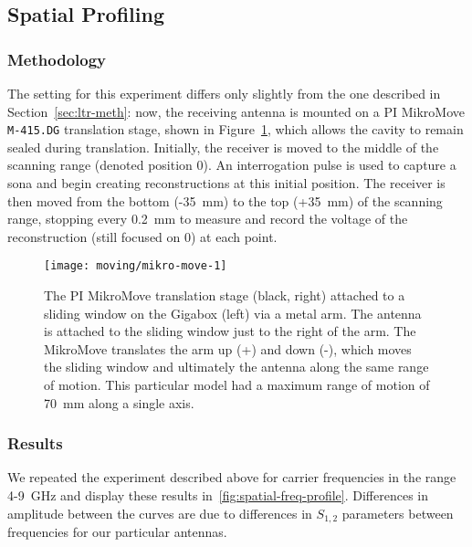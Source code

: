 \subsection{Spatial Profiling}
\label{sec:spatial-profile}
\subsubsection{Methodology}

The setting for this experiment differs only slightly from the one described in Section~\ref{sec:ltr-meth}: now, the receiving antenna is mounted on a PI MikroMove \texttt{M-415.DG} translation stage, shown in Figure~\ref{fig:mikro-move}, which allows the cavity to remain sealed during translation.  Initially, the receiver is moved to the middle of the scanning range (denoted position 0). An interrogation pulse is used to capture a sona and begin creating reconstructions at this initial position. The receiver is then moved from the bottom (-35~mm) to the top (+35~mm) of the scanning range, stopping every 0.2~mm to measure and record the \ptp{} voltage of the reconstruction (still focused on 0) at each point.

\begin{figure}[h!]
\centering
\texttt{[image: moving/mikro-move-1]}
    \caption[MikroMove Translation Stage]{The PI MikroMove translation stage (black, right) attached to a sliding window on the Gigabox (left) via a metal arm. The antenna is attached to the sliding window just to the right of the arm. The MikroMove translates the arm up (+) and down (-), which moves the sliding window and ultimately the antenna along the same range of motion. This particular model had a maximum range of motion of 70~mm along a single axis.}
    \label{fig:mikro-move}
\end{figure}


\subsubsection{Results}
\label{sec:spatial-results}

We repeated the experiment described above for carrier frequencies in the range 4-9~GHz and display these results in~\ref{fig:spatial-freq-profile}. Differences in amplitude between the curves are due to differences in $S_{1,2}$ parameters between frequencies for our particular antennas.


